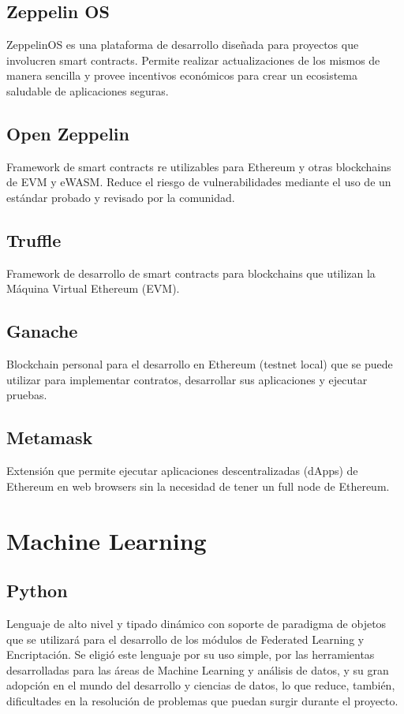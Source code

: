 \documentclass[
11pt, %
oneside, %
spanish, %
singlespacing, %
headsepline, %
chapterinoneline, %
]{MastersDoctoralThesis} %
\begin{document}
\subsection{Zeppelin OS \cite{zos}}
ZeppelinOS es una plataforma de desarrollo diseñada para proyectos que involucren smart contracts. Permite realizar actualizaciones de los mismos de manera sencilla y provee incentivos económicos para crear un ecosistema saludable de aplicaciones seguras.

\subsection{Open Zeppelin \cite{oz}}
Framework de smart contracts re utilizables para Ethereum y otras blockchains de EVM y eWASM. Reduce el riesgo de vulnerabilidades mediante el uso de un estándar probado y revisado por la comunidad.

\subsection{Truffle \cite{tr}}
Framework de desarrollo de smart contracts para blockchains que utilizan la Máquina Virtual Ethereum (EVM).

\subsection{Ganache \cite{gch}}
Blockchain personal para el desarrollo en Ethereum (testnet local) que se puede utilizar para implementar contratos, desarrollar sus aplicaciones y ejecutar pruebas.

\subsection{Metamask \cite{mk}}
Extensión que permite ejecutar aplicaciones descentralizadas (dApps) de Ethereum en web browsers sin la necesidad de tener un full node de Ethereum.

\section{Machine Learning}

\subsection{Python \cite{py}}
Lenguaje de alto nivel y tipado dinámico con soporte de paradigma de objetos que se utilizará para el desarrollo de los módulos de Federated Learning y Encriptación. Se eligió este lenguaje por su uso simple, por las herramientas desarrolladas para las áreas de Machine Learning y análisis de datos, y su gran adopción en el mundo del desarrollo y ciencias de datos, lo que reduce, también, dificultades en la resolución de problemas que puedan surgir durante el proyecto.
\end{document}
